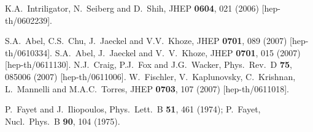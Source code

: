 \documentclass[11pt]{article}
\begin{document}
\begin{thebibliography}{999}
  K.A.~Intriligator, N.~Seiberg and D.~Shih,
  JHEP {\bf 0604}, 021 (2006)
  [hep-th/0602239].

%  
S.A.~Abel, C.S.~Chu, J.~Jaeckel and V.V.~Khoze,
  JHEP {\bf 0701}, 089 (2007)
  [hep-th/0610334].
S.A.~Abel, J.~Jaeckel and V.~V.~Khoze,
  JHEP {\bf 0701}, 015 (2007)
  [hep-th/0611130].
%  
  N.J.~Craig, P.J.~Fox and J.G.~Wacker,
  Phys.\ Rev.\  D {\bf 75}, 085006 (2007)
  [hep-th/0611006].
%  
  W.~Fischler, V.~Kaplunovsky, C.~Krishnan, L.~Mannelli and M.A.C.~Torres,
  JHEP {\bf 0703}, 107 (2007)
  [hep-th/0611018].

P.~Fayet and J.~Iliopoulos,
  Phys.\ Lett.\ B {\bf 51}, 461 (1974);
P.~Fayet, 
  Nucl.\ Phys.\ B {\bf 90}, 104 (1975).


\end{thebibliography}
\end{document}
